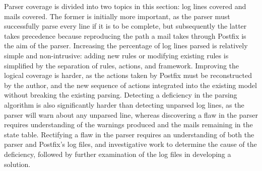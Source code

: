 Parser coverage is divided into two topics in this section: log lines
covered and mails covered.  The former is initially more important, as the
parser must successfully parse every line if it is to be complete, but
subsequently the latter takes precedence because reproducing the path a
mail takes through Postfix is the aim of the parser.  Increasing the
percentage of log lines parsed is relatively simple and non-intrusive:
adding new rules or modifying existing rules is simplified by the
separation of rules, actions, and framework.  Improving the logical coverage
is harder, as the actions taken by Postfix must be reconstructed by the
author, and the new sequence of actions integrated into the existing model
without breaking the existing parsing.  Detecting a deficiency in the
parsing algorithm is also significantly harder than detecting unparsed log
lines, as the parser will warn about any unparsed line, whereas discovering
a flaw in the parser requires understanding of the warnings produced and
the mails remaining in the state table.  Rectifying a flaw in the parser
requires an understanding of both the parser and Postfix's log files, and
investigative work to determine the cause of the deficiency, followed by
further examination of the log files in developing a solution.

